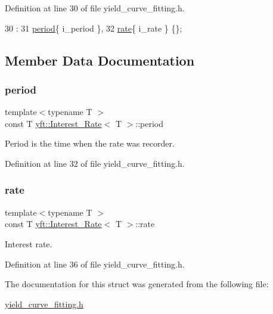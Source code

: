 Definition at line 30 of file yield\+\_\+curve\+\_\+fitting.\+h.


\begin{DoxyCode}
30                                                           :
31             \hyperlink{structyft_1_1_interest___rate_adeafaf459ce768f05ae0a74b0b4f8231}{period}\{ i\_period \},
32             \hyperlink{structyft_1_1_interest___rate_a3ec702c9390d7de88e939c5cfbef7c2c}{rate}\{ i\_rate \} \{\};
\end{DoxyCode}


\subsection{Member Data Documentation}
\mbox{\label{structyft_1_1_interest___rate_adeafaf459ce768f05ae0a74b0b4f8231}} 
\subsubsection{\texorpdfstring{period}{period}}
{\footnotesize\ttfamily template$<$typename T $>$ \\
const T \hyperlink{structyft_1_1_interest___rate}{yft\+::\+Interest\+\_\+\+Rate}$<$ T $>$\+::period}



Period is the time when the rate was recorder. 



Definition at line 32 of file yield\+\_\+curve\+\_\+fitting.\+h.

\mbox{\label{structyft_1_1_interest___rate_a3ec702c9390d7de88e939c5cfbef7c2c}} 
\subsubsection{\texorpdfstring{rate}{rate}}
{\footnotesize\ttfamily template$<$typename T $>$ \\
const T \hyperlink{structyft_1_1_interest___rate}{yft\+::\+Interest\+\_\+\+Rate}$<$ T $>$\+::rate}



Interest rate. 



Definition at line 36 of file yield\+\_\+curve\+\_\+fitting.\+h.



The documentation for this struct was generated from the following file\+:\begin{DoxyCompactItemize}
\item 
\hyperlink{yield__curve__fitting_8h}{yield\+\_\+curve\+\_\+fitting.\+h}\end{DoxyCompactItemize}
